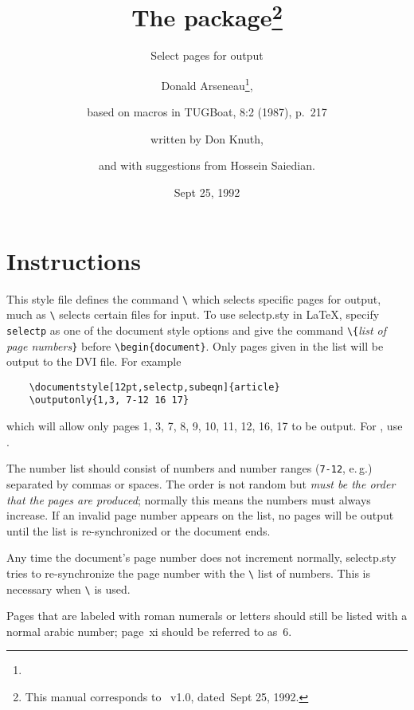 \documentclass[pagesize=auto, fontsize=12pt]{scrartcl}
\title{The \pkg{selectp} package\thanks{This manual corresponds to \pkg{selectp}~v1.0, dated~Sept 25, 1992.}}
\subtitle{Select pages for output}
\author{%
  Donald Arseneau\thanks{\mail{asnd@triumf.ca}},%
  \and based on macros in TUGBoat, 8:2 (1987), p.~217%
  \and written by Don Knuth,%
  \and and with suggestions from Hossein Saiedian.%
}
\date{Sept 25, 1992}
\makeatletter
\newcommand*{\pkg}[1]{\textsf{#1}}
\newcommand*{\cs}[1]{\texttt{\textbackslash#1}}
\newcommand*{\cmd}[1]{\cs{\expandafter\@gobble\string#1}}
\newcommand*{\opt}[1]{\texttt{#1}}
\newcommand*{\meta}[1]{\textlangle\textsl{#1}\textrangle}
\newcommand*{\marg}[1]{\texttt{\{}\meta{#1}\texttt{\}}}
\newcommand*{\outputonly}[1]{\cmd{\outputonly}\texttt{\{#1\}}}
\makeatother
\begin{document}
\maketitle


\section{Instructions}

This style file defines the command \cmd{\outputonly} which selects specific
pages for output, much as \cmd{} selects certain files for input.
To use \pkg{selectp.sty} in \LaTeX, specify \opt{selectp} as one of the document
style options and give the command \cmd{\outputonly}\marg{list of page numbers}
before \verb|\begin{document}|.  Only pages given in the list will be output
to the DVI file.  For example
%
\begin{verbatim}
    \documentstyle[12pt,selectp,subeqn]{article}
    \outputonly{1,3, 7-12 16 17}
\end{verbatim}
%
which will allow only pages 1, 3, 7, 8, 9, 10, 11, 12, 16, 17 to be output.
For , use \verb||.

The number list should consist of numbers and number ranges (\verb|7-12|, e.\,g.)\ %
separated by commas or spaces. The order is not random but \emph{must be the
order that the pages are produced}; normally this means the numbers must
always increase.  If an invalid page number appears on the list, no pages
will be output until the list is re-synchronized or the document ends.

Any time the document's page number does not increment normally,
\pkg{selectp.sty} tries to re-synchronize the page number with the \cmd{\outputonly}
list of numbers.  This is necessary when \cmd{} is used. 

Pages that are labeled with roman numerals or letters should still be
listed with a normal arabic number; page~xi should be referred to as~6.
\end{document}

